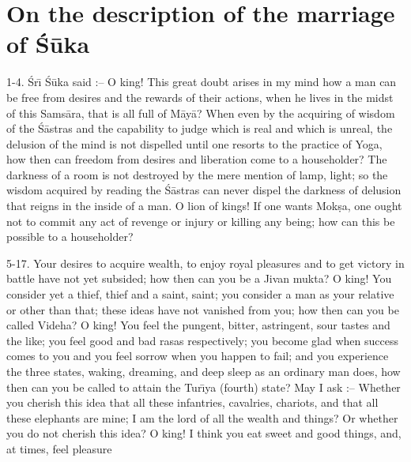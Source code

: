 \chapter{On the description of the marriage of \'S\=uka}

1-4. \'Sr\={\i} \'S\=uka said :-- O king! This great doubt arises in my mind how a man can be free from desires and the rewards of their actions, when he lives in the midst of this Sams\=ara, that is all full of M\=ay\=a? When even by the acquiring of wisdom of the \'S\=astras and the capability to judge which is real and which is unreal, the delusion of the mind is not dispelled until one resorts to the practice of Yoga, how then can freedom from desires and liberation come to a householder? The darkness of a room is not destroyed by the mere mention of lamp, light; so the wisdom acquired by reading the \'S\=astras can never dispel the darkness of delusion that reigns in the inside of a man. O lion of kings! If one wants Mok\d{s}a, one ought not to commit any act of revenge or injury or killing any being; how can this be possible to a householder?

5-17. Your desires to acquire wealth, to enjoy royal pleasures and to get victory in battle have not yet subsided; how then can you be a Jivan mukta? O king! You consider yet a thief, thief and a saint, saint; you consider a man as your relative or other than that; these ideas have not vanished from you; how then can you be called Videha? O king! You feel the pungent, bitter, astringent, sour tastes and the like; you feel good and bad rasas respectively; you become glad when success comes to you and you feel sorrow when you happen to fail; and you experience the three states, waking, dreaming, and deep sleep as an ordinary man does, how then can you be called to attain the Tur\={\i}ya (fourth) state? May I ask :-- Whether you cherish this idea that all these infantries, cavalries, chariots, and that all these elephants are mine; I am the lord of all the wealth and things? Or whether you do not cherish this idea? O king! I think you eat sweet and good things, and, at times, feel pleasure

